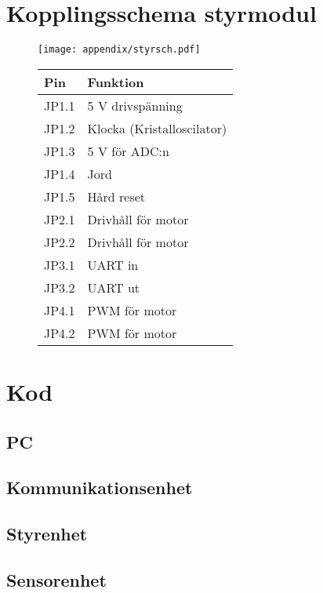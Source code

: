 \section{Kopplingsschema styrmodul}
\label{styr-sch}
  \begin{figure}[ht!]
    \centering
      \texttt{[image: appendix/styrsch.pdf]}
      \begin{tabular}{| l | l |}
        \hline
        \textbf{Pin} & \textbf{Funktion} \\ \hline
        JP1.1 & 5 V drivspänning \\ \hline
        JP1.2 & Klocka (Kristalloscilator) \\ \hline
        JP1.3 & 5 V för ADC:n \\ \hline
        JP1.4 & Jord \\ \hline
        JP1.5 & Hård reset \\ \hline
        JP2.1 & Drivhåll för motor \\ \hline
        JP2.2 & Drivhåll för motor \\ \hline
        JP3.1 & UART in \\ \hline
        JP3.2 & UART ut \\ \hline
        JP4.1 & PWM för motor \\ \hline
        JP4.2 & PWM för motor \\ \hline
      \end{tabular}
    \end{figure}
\section{Kod}
\subsection{PC}

\subsection{Kommunikationsenhet}
\subsection{Styrenhet}
\subsection{Sensorenhet}
